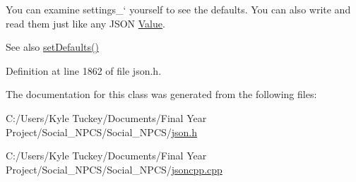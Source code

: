 You can examine \textquotesingle{}settings\+\_\+` yourself to see the defaults. You can also write and read them just like any J\+S\+ON \hyperlink{class_json_1_1_value}{Value}. \begin{DoxySeeAlso}{See also}
\hyperlink{class_json_1_1_stream_writer_builder_a53bf106b141e28637b01ad0ecd2acbf6}{set\+Defaults()} 
\end{DoxySeeAlso}


Definition at line 1862 of file json.\+h.



The documentation for this class was generated from the following files\+:\begin{DoxyCompactItemize}
\item 
C\+:/\+Users/\+Kyle Tuckey/\+Documents/\+Final Year Project/\+Social\+\_\+\+N\+P\+C\+S/\+Social\+\_\+\+N\+P\+C\+S/\hyperlink{json_8h}{json.\+h}\item 
C\+:/\+Users/\+Kyle Tuckey/\+Documents/\+Final Year Project/\+Social\+\_\+\+N\+P\+C\+S/\+Social\+\_\+\+N\+P\+C\+S/\hyperlink{jsoncpp_8cpp}{jsoncpp.\+cpp}\end{DoxyCompactItemize}
